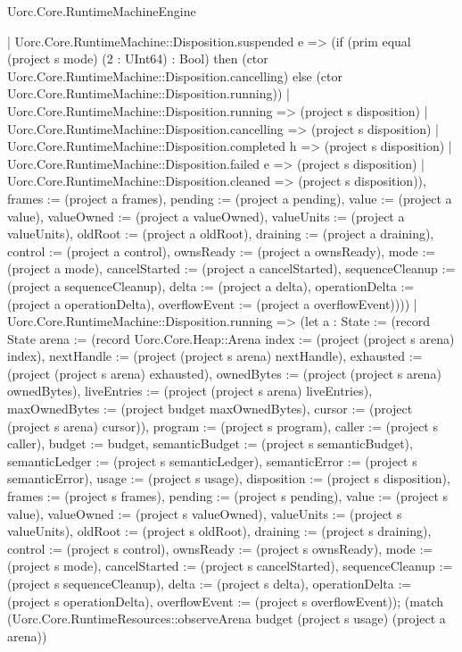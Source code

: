 \begin{lexlean}{Uorc.Core.RuntimeMachineEngine}
\begin{semanticmodule}
{{        | Uorc.Core.RuntimeMachine::Disposition.suspended e => (if (prim equal (project s mode) (2 : UInt64) : Bool) then (ctor Uorc.Core.RuntimeMachine::Disposition.cancelling) else (ctor Uorc.Core.RuntimeMachine::Disposition.running))
        | Uorc.Core.RuntimeMachine::Disposition.running => (project s disposition)
        | Uorc.Core.RuntimeMachine::Disposition.cancelling => (project s disposition)
        | Uorc.Core.RuntimeMachine::Disposition.completed h => (project s disposition)
        | Uorc.Core.RuntimeMachine::Disposition.failed e => (project s disposition)
        | Uorc.Core.RuntimeMachine::Disposition.cleaned => (project s disposition)), frames := (project a frames), pending := (project a pending), value := (project a value), valueOwned := (project a valueOwned), valueUnits := (project a valueUnits), oldRoot := (project a oldRoot), draining := (project a draining), control := (project a control), ownsReady := (project a ownsReady), mode := (project a mode), cancelStarted := (project a cancelStarted), sequenceCleanup := (project a sequenceCleanup), delta := (project a delta), operationDelta := (project a operationDelta), overflowEvent := (project a overflowEvent)})))
    | Uorc.Core.RuntimeMachine::Disposition.running => (let a : State := (record State {arena := (record Uorc.Core.Heap::Arena {index := (project (project s arena) index), nextHandle := (project (project s arena) nextHandle), exhausted := (project (project s arena) exhausted), ownedBytes := (project (project s arena) ownedBytes), liveEntries := (project (project s arena) liveEntries), maxOwnedBytes := (project budget maxOwnedBytes), cursor := (project (project s arena) cursor)}), program := (project s program), caller := (project s caller), budget := budget, semanticBudget := (project s semanticBudget), semanticLedger := (project s semanticLedger), semanticError := (project s semanticError), usage := (project s usage), disposition := (project s disposition), frames := (project s frames), pending := (project s pending), value := (project s value), valueOwned := (project s valueOwned), valueUnits := (project s valueUnits), oldRoot := (project s oldRoot), draining := (project s draining), control := (project s control), ownsReady := (project s ownsReady), mode := (project s mode), cancelStarted := (project s cancelStarted), sequenceCleanup := (project s sequenceCleanup), delta := (project s delta), operationDelta := (project s operationDelta), overflowEvent := (project s overflowEvent)}); (match (Uorc.Core.RuntimeResources::observeArena budget (project s usage) (project a arena))
}
\end{semanticmodule}
\end{lexlean}
